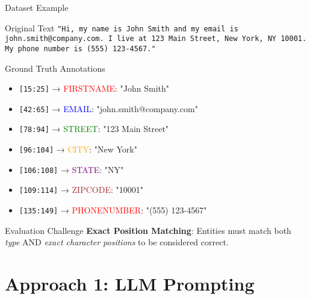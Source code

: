 \documentclass[aspectratio=169]{beamer}
\begin{document}
\begin{frame}{Dataset Example}
\begin{block}{Original Text}
\texttt{"Hi, my name is John Smith and my email is john.smith@company.com. I live at 123 Main Street, New York, NY 10001. My phone number is (555) 123-4567."}
\end{block}

\begin{block}{Ground Truth Annotations}
\begin{itemize}
\item \texttt{[15:25]} → \textcolor{red}{FIRSTNAME}: "John Smith"
\item \texttt{[42:65]} → \textcolor{blue}{EMAIL}: "john.smith@company.com"
\item \texttt{[78:94]} → \textcolor{green}{STREET}: "123 Main Street"
\item \texttt{[96:104]} → \textcolor{orange}{CITY}: "New York"
\item \texttt{[106:108]} → \textcolor{purple}{STATE}: "NY"
\item \texttt{[109:114]} → \textcolor{brown}{ZIPCODE}: "10001"
\item \texttt{[135:149]} → \textcolor{red}{PHONENUMBER}: "(555) 123-4567"
\end{itemize}
\end{block}

\begin{block}{Evaluation Challenge}
\textbf{Exact Position Matching}: Entities must match both \textit{type} AND \textit{exact character positions} to be considered correct.
\end{block}
\end{frame}

\section{Approach 1: LLM Prompting}
\end{document}
